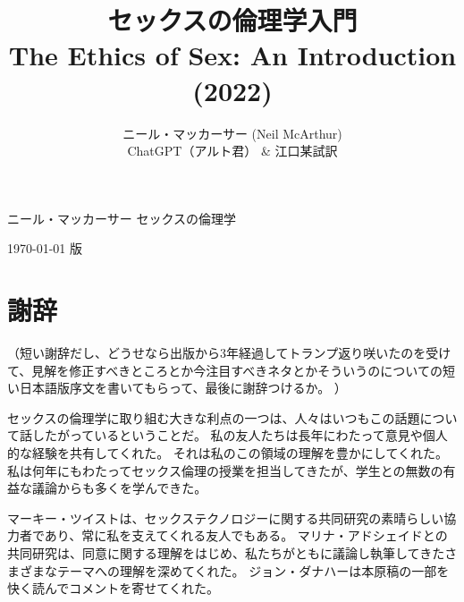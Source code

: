 \documentclass[paper=a4,book,openany]{jlreq}
\title{セックスの倫理学入門 \\ The Ethics of Sex: An Introduction (2022)}
\author{ニール・マッカーサー (Neil McArthur) \\ ChatGPT（アルト君） \& 江口某試訳}
\begin{document}
\frontmatter

\begin{center}
\vspace{3\zw}
{\Huge ニール・マッカーサー}
\vspace{1\zw}
{\Huge セックスの倫理学}

   \end{center}

  \begin{center}
  \today\hspace{1\zw} \DTMcurrenttime 版
  \end{center}


\tableofcontents
{}
\chapter*{謝辞}

（短い謝辞だし、どうせなら出版から3年経過してトランプ返り咲いたのを受けて、見解を修正すべきところとか今注目すべきネタとかそういうのについての短い日本語版序文を書いてもらって、最後に謝辞つけるか。
）

\vspace{2\zw}
セックスの倫理学に取り組む大きな利点の一つは、人々はいつもこの話題について話したがっているということだ。
私の友人たちは長年にわたって意見や個人的な経験を共有してくれた。
それは私のこの領域の理解を豊かにしてくれた。
私は何年にもわたってセックス倫理の授業を担当してきたが、学生との無数の有益な議論からも多くを学んできた。

マーキー・ツイストは、セックステクノロジーに関する共同研究の素晴らしい協力者であり、常に私を支えてくれる友人でもある。
マリナ・アドシェイドとの共同研究は、同意に関する理解をはじめ、私たちがともに議論し執筆してきたさまざまなテーマへの理解を深めてくれた。
ジョン・ダナハーは本原稿の一部を快く読んでコメントを寄せてくれた。
\end{document}

